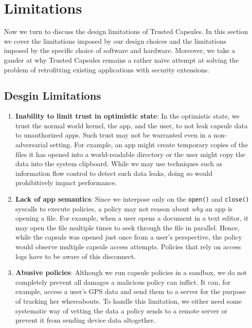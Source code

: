 \chapter{Limitations}
\label{sec:limitations}

Now we turn to discuss the design limitations of Trusted Capsules. In this
section we cover the limitations imposed by our design choices and the
limitations imposed by the specific choice of software and hardware. Moreover,
we take a gander at why Trusted Capsules remains a rather naive attempt at
solving the problem of retrofitting existing applications with security
extensions.

\section{Desgin Limitations}
\begin{enumerate}
    \item {\bf Inability to limit trust in optimistic state}: In the optimistic state, we
trust the normal world kernel, the app, and the user, to not leak capsule data
to unauthorized apps. Such trust may not be warranted even in a non-adversarial
setting. For example, an app might create temporary copies of the files it has
opened into a world-readable directory or the user might copy the data into the
system clipboard. While we may use techniques such as information flow control
to detect such data leaks, doing so would prohibitively impact performance.

    \item {\bf Lack of app semantics}: Since we interpose only on the {\tt open()} and
    {\tt close()} syscalls to execute policies, a policy may not reason about {\em
        why} an app is opening a file. For example, when a user opens a document in a
text editor, it may open the file multiple times to seek through the file in
parallel. Hence, while the capsule was opened just once from a user's
perspective, the policy would observe multiple capsule access attempts. Policies
that rely on access logs have to be aware of this disconnect.

    \item {\bf Abusive policies}: Although we run capsule policies in a sandbox, we do not
completely prevent all damages a malicious policy can inflict. It can, for
example, access a user's GPS data and send them to a server for the purpose of
tracking her whereabouts. To handle this limitation, we either need some
systematic way of vetting the data a policy sends to a remote server or prevent
it from sending device data altogether.


\end{enumerate}

